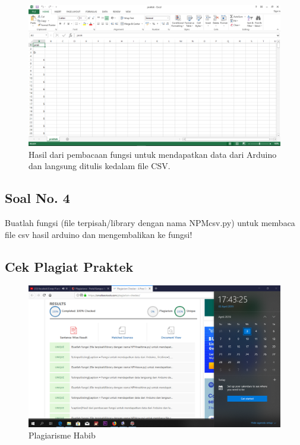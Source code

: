 \begin{figure}[H]
	\includegraphics[scale=0.2]{figures/5/Praktek/1174002/csv.png}
	\centering
	\caption{Hasil dari pembacaan fungsi untuk mendapatkan data dari Arduino dan langsung ditulis kedalam file CSV.}
\end{figure}

\subsection{Soal No. 4}
Buatlah fungsi (file terpisah/library dengan nama NPMcsv.py) untuk membaca file csv hasil arduino dan mengembalikan ke fungsi!


\subsection{Cek Plagiat Praktek}
\begin{figure}[H]
	\includegraphics[scale=0.2]{figures/5/Praktek/1174002/plagiat.png}
	\caption{Plagiarisme Habib}
	\centering
\end{figure}

